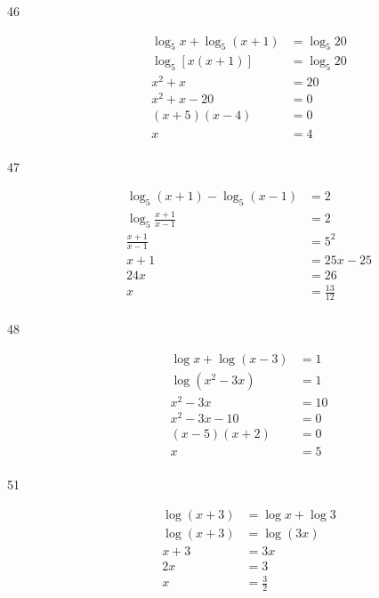 \documentclass{exam}
\begin{document}
\begin{description}
      \item[46] 
        \begin{align*}
          \log_5 x + \log_5(x + 1) &= \log_5 20 \\
          \log_5 [x(x + 1)]        &= \log_5 20 \\
          x^2 + x                  &= 20 \\
          x^2 + x - 20             &= 0 \\
          (x + 5)(x - 4)           &= 0 \\
          x                        &= \boxed{4} \\
        \end{align*}

      \item[47] 
        \begin{align*}
          \log_5 (x + 1) - \log_5 (x - 1) &= 2 \\
          \log_5 \frac{x + 1}{x - 1}      &= 2 \\
          \frac{x + 1}{x - 1}             &= 5^2 \\
          x + 1                           &= 25x - 25 \\
          24x                             &= 26 \\
          x                               &= \boxed{\frac{13}{12}} \\
        \end{align*}

      \item[48] 
        \begin{align*}
          \log x + \log (x - 3)        &= 1 \\
          \log \left( x^2 - 3x \right) &= 1 \\
          x^2 - 3x                     &= 10 \\
          x^2 - 3x - 10                &= 0 \\
          (x - 5)(x + 2)               &= 0 \\
          x                            &= \boxed{5} \\
        \end{align*}

      \item[51] 
        \begin{align*}
          \log (x + 3) &= \log x + \log 3 \\
          \log (x + 3) &= \log (3x) \\
           x + 3       &= 3x \\
           2x          &= 3 \\
           x           &= \boxed{\frac{3}{2}} \\
        \end{align*}


\end{description}
\end{document}
